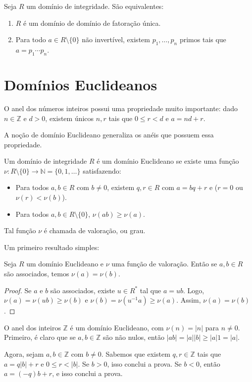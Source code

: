 \begin{prop}
Seja $R$ um domínio de integridade.
São equivalentes:
\begin{enumerate}[label=\alph*)]
    \item $R$ é um domínio de domínio de fatoração única.
    \item Para todo $a\in R\setminus \{0\}$ não invertível, existem $p_1, \dots, p_n$ primos tais que $a=p_1\cdots p_n$.
\end{enumerate}
\end{prop}

\section{Domínios Euclideanos}
O anel dos números inteiros possui uma propriedade muito importante:
dado $n\in \mathbb Z$ e $d>0$, existem únicos $n, r$ tais que $0\leq r < d$ e $a=nd+r$.

A noção de domínio Euclideano generaliza os anéis que possuem essa propriedade.

\begin{definition}
    Um domínio de integridade $R$ é um domínio Euclideano
    se existe uma função $\nu:R\setminus \{0\} \to \mathbb N=\{0, 1, \dots\}$ satisfazendo:
    \begin{itemize}
        \item Para todos $a, b \in R$ com $b\neq 0$, existem $q, r \in R$ com $a=bq+r$ e ($r=0$ ou $\nu(r)<\nu(b)$).
        \item Para todos $a, b \in R\setminus \{0\}$, $\nu(ab)\geq \nu(a)$.
    \end{itemize}

    Tal função $\nu$ é chamada de valoração, ou grau.
\end{definition}
Um primeiro resultado simples:
\begin{definition}
    Seja $R$ um domínio Euclideano e $\nu$ uma função de valoração.
    Então se $a, b \in R$ são associados, temos $\nu(a)=\nu(b)$.
\end{definition}
\begin{proof}
    Se $a$ e $b$ são associados, existe $u \in R^*$ tal que $a=ub$.
    Logo, $\nu(a)=\nu(ub)\geq \nu(b)$ e $\nu(b)=\nu(u^{-1}a)\geq \nu(a)$.
    Assim, $\nu(a)=\nu(b)$.
\end{proof}

\begin{exemplo}
    O anel dos inteiros $\mathbb Z$ é um domínio Euclideano, com $\nu(n)=|n|$ para $n\neq 0$.
    Primeiro, é claro que se $a, b\in \mathbb Z$ são não nulos, então $|ab|=|a||b|\geq |a|1=|a|$.

    Agora, sejam $a, b\in \mathbb Z$ com $b\neq 0$.
    Sabemos que existem $q, r \in \mathbb Z$ tais que $a=q|b|+r$ e $0\leq r < |b|$.
    Se $b>0$, isso conclui a prova.
    Se $b<0$, então $a=(-q)b+r$, e isso conclui a prova.
\end{exemplo}

